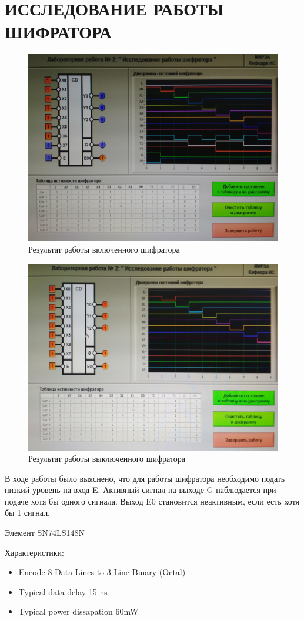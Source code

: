 \section{ИССЛЕДОВАНИЕ РАБОТЫ ШИФРАТОРА}

\begin{figure}[H]
	\centering
	\includegraphics[width=0.95\linewidth]{imgs/2/1}
	\caption{Результат работы включенного шифратора}
	\label{fig:2_on}
\end{figure}

\begin{figure}[H]
	\centering
	\includegraphics[width=0.95\linewidth]{imgs/2/2}
	\caption{Результат работы выключенного шифратора}
	\label{fig:2_off}
\end{figure}

В ходе работы было выяснено, что для работы шифратора необходимо подать низкий уровень на вход E.
Активный сигнал на выходе G наблюдается при подаче хотя бы одного сигнала.
Выход E0 становится неактивным, если есть хотя бы 1 сигнал.

Элемент SN74LS148N

Характеристики:
\begin{itemize}
	\item Encode 8 Data Lines to 3-Line Binary (Octal)
	\item Typical data delay 15 ns
	\item Typical power dissapation 60mW
\end{itemize}